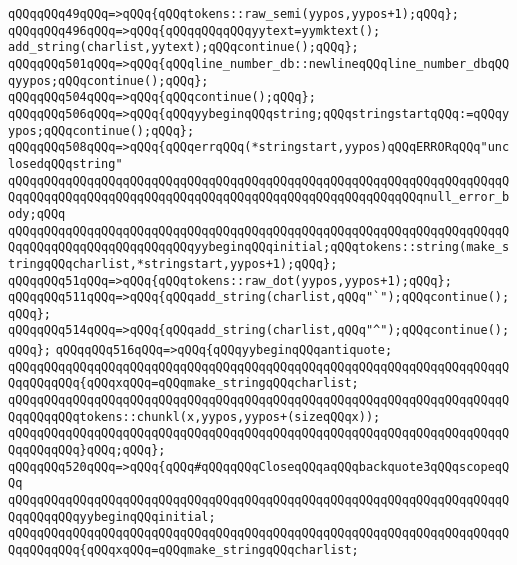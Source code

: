 \verb|qQQqqQQq49qQQq=>qQQq{qQQqtokens::raw_semi(yypos,yypos+1);qQQq};|\newline
\verb|qQQqqQQq496qQQq=>qQQq{qQQqqQQqqQQqyytext=yymktext();|\newline
\verb|add_string(charlist,yytext);qQQqcontinue();qQQq};|\newline
\verb|qQQqqQQq501qQQq=>qQQq{qQQqline_number_db::newlineqQQqline_number_dbqQQqyypos;qQQqcontinue();qQQq};|\newline
\verb|qQQqqQQq504qQQq=>qQQq{qQQqcontinue();qQQq};|\newline
\verb|qQQqqQQq506qQQq=>qQQq{qQQqyybeginqQQqstring;qQQqstringstartqQQq:=qQQqyypos;qQQqcontinue();qQQq};|\newline
\verb|qQQqqQQq508qQQq=>qQQq{qQQqerrqQQq(*stringstart,yypos)qQQqERRORqQQq"unclosedqQQqstring"|\newline
\verb|qQQqqQQqqQQqqQQqqQQqqQQqqQQqqQQqqQQqqQQqqQQqqQQqqQQqqQQqqQQqqQQqqQQqqQQqqQQqqQQqqQQqqQQqqQQqqQQqqQQqqQQqqQQqqQQqqQQqqQQqqQQqqQQqnull_error_body;qQQq|\newline
\verb|qQQqqQQqqQQqqQQqqQQqqQQqqQQqqQQqqQQqqQQqqQQqqQQqqQQqqQQqqQQqqQQqqQQqqQQqqQQqqQQqqQQqqQQqqQQqqQQqyybeginqQQqinitial;qQQqtokens::string(make_stringqQQqcharlist,*stringstart,yypos+1);qQQq};|\newline
\verb|qQQqqQQq51qQQq=>qQQq{qQQqtokens::raw_dot(yypos,yypos+1);qQQq};|\newline
\verb|qQQqqQQq511qQQq=>qQQq{qQQqadd_string(charlist,qQQq"`");qQQqcontinue();qQQq};|\newline
\verb|qQQqqQQq514qQQq=>qQQq{qQQqadd_string(charlist,qQQq"^");qQQqcontinue();qQQq};|\newline
\verb|qQQqqQQq516qQQq=>qQQq{qQQqyybeginqQQqantiquote;|\newline
\verb|qQQqqQQqqQQqqQQqqQQqqQQqqQQqqQQqqQQqqQQqqQQqqQQqqQQqqQQqqQQqqQQqqQQqqQQqqQQqqQQq{qQQqxqQQq=qQQqmake_stringqQQqcharlist;|\newline
\verb|qQQqqQQqqQQqqQQqqQQqqQQqqQQqqQQqqQQqqQQqqQQqqQQqqQQqqQQqqQQqqQQqqQQqqQQqqQQqqQQqtokens::chunkl(x,yypos,yypos+(sizeqQQqx));|\newline
\verb|qQQqqQQqqQQqqQQqqQQqqQQqqQQqqQQqqQQqqQQqqQQqqQQqqQQqqQQqqQQqqQQqqQQqqQQqqQQqqQQq}qQQq;qQQq};|\newline
\verb|qQQqqQQq520qQQq=>qQQq{qQQq#qQQqqQQqCloseqQQqaqQQqbackquote3qQQqscopeqQQq|\newline
\verb|qQQqqQQqqQQqqQQqqQQqqQQqqQQqqQQqqQQqqQQqqQQqqQQqqQQqqQQqqQQqqQQqqQQqqQQqqQQqqQQqyybeginqQQqinitial;|\newline
\verb|qQQqqQQqqQQqqQQqqQQqqQQqqQQqqQQqqQQqqQQqqQQqqQQqqQQqqQQqqQQqqQQqqQQqqQQqqQQqqQQq{qQQqxqQQq=qQQqmake_stringqQQqcharlist;|\newline
